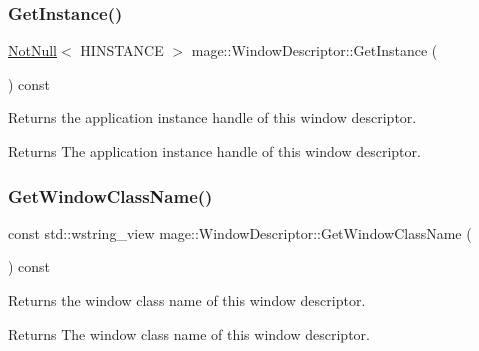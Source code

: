 \subsubsection{\texorpdfstring{Get\+Instance()}{GetInstance()}}
{\footnotesize\ttfamily \mbox{\hyperlink{namespacemage_a8769f9d670d6b585ea306cb1062af94b}{Not\+Null}}$<$ H\+I\+N\+S\+T\+A\+N\+CE $>$ mage\+::\+Window\+Descriptor\+::\+Get\+Instance (\begin{DoxyParamCaption}{ }\end{DoxyParamCaption}) const\hspace{0.3cm}{\ttfamily [noexcept]}}

Returns the application instance handle of this window descriptor.

\begin{DoxyReturn}{Returns}
The application instance handle of this window descriptor. 
\end{DoxyReturn}
\mbox{\label{classmage_1_1_window_descriptor_af89d025d126a20c8695f00271035692d}} 
\subsubsection{\texorpdfstring{Get\+Window\+Class\+Name()}{GetWindowClassName()}}
{\footnotesize\ttfamily const std\+::wstring\+\_\+view mage\+::\+Window\+Descriptor\+::\+Get\+Window\+Class\+Name (\begin{DoxyParamCaption}{ }\end{DoxyParamCaption}) const\hspace{0.3cm}{\ttfamily [noexcept]}}

Returns the window class name of this window descriptor.

\begin{DoxyReturn}{Returns}
The window class name of this window descriptor. 
\end{DoxyReturn}
\mbox{\label{classmage_1_1_window_descriptor_a539433423c905e8b45d5bc9d895ee79c}} 

